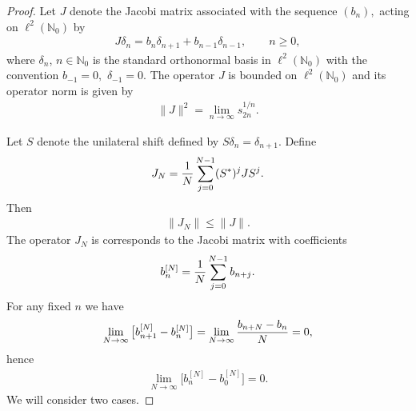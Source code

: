 \documentclass[pdftex]{sigma}
\numberwithin{equation}{section}
\begin{document}
\begin{proof}Let $J$ denote the Jacobi matrix associated with the sequence $(b_n),$ acting on $\ell^2(\mathbb{N}_0)$ by
\begin{gather*}
J\delta_n=b_n\delta_{n+1}+b_{n-1}\delta_{n-1},\qquad n\ge 0,
\end{gather*}
where $\delta_n$, $n\in\mathbb N_0$ is the standard orthonormal basis in $\ell^2(\mathbb N_0)$ with the convention $b_{-1}=0,$ $\delta_{-1}=0$.
The operator $J$ is bounded on $\ell^2(\mathbb{N}_0)$ and its operator norm is given by
\begin{gather*}
\|J\|^2=\lim_{n\to\infty}s_{2n}^{1/n}.
\end{gather*}

Let $S$ denote the unilateral shift defined by $S\delta_n=\delta_{n+1}$. Define
\begin{gather*}
J_N={1\over N}\sum_{j=0}^{N-1}(S^*)^jJS^j.
\end{gather*}
Then
 \begin{gather*}
\|J_N\|\le \|J\|.
\end{gather*}
The operator $J_N$ is corresponds to the Jacobi matrix with coefficients
\begin{gather*}
b_n^{[N]}={1\over N}\sum_{j=0}^{N-1}b_{n+j}.
\end{gather*}
For any fixed $n$ we have
\begin{gather*}
\lim_{N\to\infty} \big[b_{n+1}^{[N]}-b_n^{[N]}\big]=\lim_{N\to\infty}{b_{n+N}-b_{n}\over N}=0,
\end{gather*}
hence
\begin{gather}\label{limit}
\lim_{N\to\infty} \big[b_{n}^{[N]}-b_0^{[N]}\big]=0.
\end{gather}
We will consider two cases.


\end{proof}
\end{document}
